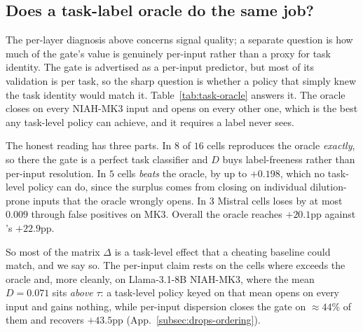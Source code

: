 \subsection{Does a task-label oracle do the same job?}
\label{subsec:task-oracle}

The per-layer diagnosis above concerns signal quality; a separate question
is how much of the gate's value is genuinely per-input rather than a proxy
for task identity. The gate is advertised as a per-input predictor, but
most of its validation is per task, so the sharp question is whether a
policy that simply knew the task identity would match it.
Table~\ref{tab:task-oracle} answers it. The oracle closes on every
NIAH-MK3 input and opens on every other one, which is the best any
task-level policy can achieve, and it requires a label \method never sees.

The honest reading has three parts. In $8$ of $16$ cells \method
reproduces the oracle \emph{exactly}, so there the gate is a perfect task
classifier and $D$ buys label-freeness rather than per-input resolution.
In $5$ cells \method \emph{beats} the oracle, by up to $+0.198$, which no
task-level policy can do, since the surplus comes from closing on
individual dilution-prone inputs that the oracle wrongly opens. In $3$
Mistral cells \method loses by at most $0.009$ through false positives on
MK3. Overall the oracle reaches $+20.1$pp against \method's $+22.9$pp.

So most of the matrix $\Delta$ is a task-level effect that a cheating
baseline could match, and we say so. The per-input claim rests on the
cells where \method exceeds the oracle and, more cleanly, on
Llama-3.1-8B NIAH-MK3, where the mean $D = 0.071$ sits \emph{above}
$\tau$: a task-level policy keyed on that mean opens on every input and
gains nothing, while per-input dispersion closes the gate on $\approx
44\%$ of them and recovers $+43.5$pp (App.~\ref{subsec:drops-ordering}).

